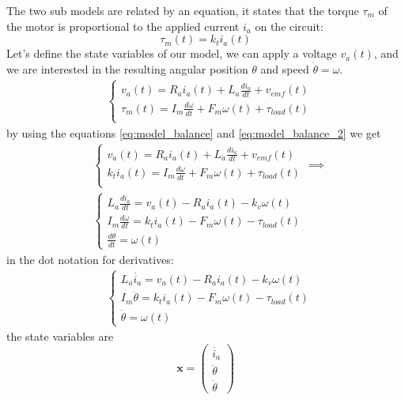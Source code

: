\documentclass[10pt, letterpaper]{report}
\begin{document}
The two sub models are related by an equation, it states that the torque $\tau_m$ of the motor is proportional to the applied current $i_a$ on the circuit:\begin{equation}\label{eq:model_balance}
    \tau_m(t)=k_ti_a(t)
\end{equation}
Let's define the state variables of our model, we can apply a voltage $v_a(t)$, and we are interested in the resulting angular position $\theta$ and speed $\dot\theta=\omega$.  \begin{align}
    &\begin{cases}
        \displaystyle v_a(t)=R_ai_a(t)+L_a\frac{d i_a}{dt}+v_{emf}(t)\\
        \displaystyle \tau_m(t)=I_m\frac{d\omega}{dt}+F_m\omega(t)+\tau_{load}(t)\\
    \end{cases}
\end{align}
by using the equations \eqref{eq:model_balance} and \eqref{eq:model_balance_2} we get
\begin{align}
    &\begin{cases}
        \displaystyle v_a(t)=R_ai_a(t)+L_a\frac{d i_a}{dt}+v_{emf}(t)\\
        \displaystyle k_ti_a(t)=I_m\frac{d\omega}{dt}+F_m\omega(t)+\tau_{load}(t)\\
    \end{cases}\implies \\ 
    &\begin{cases}
        \displaystyle L_a\frac{d i_a}{dt}=v_a(t)-R_ai_a(t)-k_v\omega(t)\\ 
        \displaystyle I_m\frac{d\omega}{dt}=k_ti_a(t)-F_m\omega(t)-\tau_{load}(t)\\
        \displaystyle \frac{d\theta}{dt}=\omega(t)
    \end{cases}
\end{align}
in the dot notation for derivatives:\begin{align}
   &\begin{cases}
        \displaystyle L_a\dot{i_a}=v_a(t)-R_ai_a(t)-k_v\omega(t)\\
        \displaystyle I_m\ddot\theta=k_ti_a(t)-F_m\omega(t)-\tau_{load}(t)\\
        \displaystyle \dot\theta=\omega(t)
    \end{cases}
\end{align}
the state variables are\begin{equation}
    \mathbf x  =\begin{pmatrix}
        \dot{i_a} \\ 
        \ddot \theta\\ 
        \dot \theta
    \end{pmatrix}
\end{equation}
\end{document}
